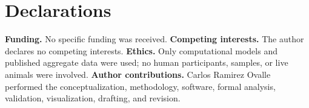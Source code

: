 \documentclass{ws-jbcb}
\numberwithin{equation}{section}
\begin{document}
\section*{Declarations}

\noindent\textbf{Funding.} No specific funding was received.
\textbf{Competing interests.} The author declares no competing interests.
\textbf{Ethics.} Only computational models and published aggregate data were
used; no human participants, samples, or live animals were involved.
\textbf{Author contributions.} Carlos Ramirez Ovalle performed the
conceptualization, methodology, software, formal analysis, validation,
visualization, drafting, and revision.



\end{document}
